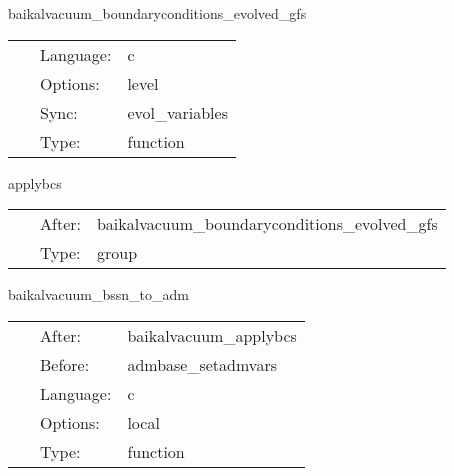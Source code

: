 \vspace{5mm}


\hspace{5mm} baikalvacuum\_boundaryconditions\_evolved\_gfs 

\hspace{5mm}{\it apply boundary conditions and perform amr+interprocessor synchronization } 


\hspace{5mm}

 \begin{tabular*}{160mm}{cll} 
~ & Language:  & c \\ 
~ & Options:  & level \\ 
~ & Sync:  & evol\_variables \\ 
~ & Type:  & function \\ 
\end{tabular*} 


\vspace{5mm}


\hspace{5mm} applybcs 

\hspace{5mm}{\it group for applying boundary conditions } 


\hspace{5mm}

 \begin{tabular*}{160mm}{cll} 
~ & After:  & baikalvacuum\_boundaryconditions\_evolved\_gfs \\ 
~ & Type:  & group \\ 
\end{tabular*} 


\vspace{5mm}


\hspace{5mm} baikalvacuum\_bssn\_to\_adm 

\hspace{5mm}{\it perform bssn-to-adm conversion. useful for diagnostics. } 


\hspace{5mm}

 \begin{tabular*}{160mm}{cll} 
~ & After:  & baikalvacuum\_applybcs \\ 
~ & Before:  & admbase\_setadmvars \\ 
~ & Language:  & c \\ 
~ & Options:  & local \\ 
~ & Type:  & function \\ 
\end{tabular*} 


